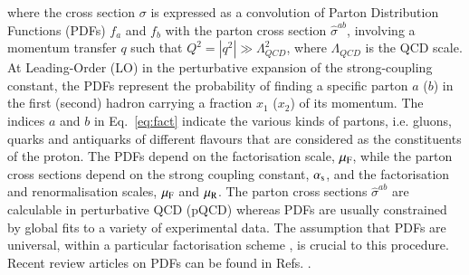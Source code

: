 where the cross section $\sigma$
is expressed
as a convolution of Parton Distribution Functions (PDFs) $f_a$ and $f_b$
with the parton cross section
$\hat{\sigma}^{ab}$,  involving a momentum transfer 
$q$ such that $Q^2 = |q^2| \gg \Lambda_{QCD}^2$, where $\Lambda_{QCD}$ is the QCD scale.  
%
At Leading-Order (LO) in the perturbative expansion of the strong-coupling constant, the PDFs represent 
the probability of finding a specific parton $a$ ($b$) in the first (second) hadron carrying a fraction $x_1$ ($x_2$) of its momentum.
%
The indices $a$ and $b$ in Eq.~\ref{eq:fact} indicate the various 
kinds of partons,
i.e. gluons, quarks and antiquarks of different flavours
that are considered
as the constituents of the proton.
%
The PDFs depend on the factorisation scale, $\mu_\mathrm{F}$, while the parton cross sections depend on the strong coupling constant,
$\alpha_\mathrm{s}$, and the factorisation and renormalisation scales,
$\mu_\mathrm{F}$ and $\mu_\mathrm{R}$.
%
The parton cross sections $\hat\sigma^{ab}$ are calculable in perturbative QCD (pQCD) whereas
PDFs are usually constrained by global fits to a variety of experimental data. The assumption that PDFs are universal, within a particular factorisation scheme \cite{Collins:1981uw,Collins:1983ju,Collins:1985ue,Collins:1989gx,Collins:2011zzd}, is crucial to this procedure.
Recent review articles on PDFs can be found in Refs. \cite{Perez:2012um,Forte:2013wc}. 
%
%

